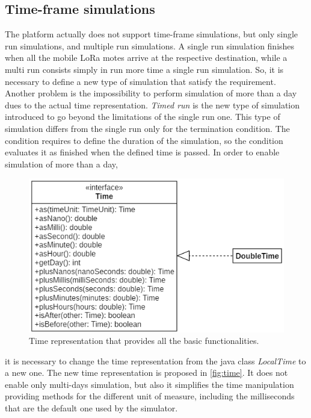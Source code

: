 \subsection*{Time-frame simulations}
The platform actually does not support time-frame simulations, but only single run simulations, and multiple run simulations.
A single run simulation finishes when all the mobile LoRa motes arrive at the respective destination, while a multi run consists simply in run more time a single run simulation.
So, it is necessary to define a new type of simulation that satisfy the requirement.
Another problem is the impossibility to perform simulation of more than a day dues to the actual time representation.
\textit{Timed run} is the new type of simulation introduced to go beyond the limitations of the single run one. 
This type of simulation differs from the single run only for the termination condition. 
The condition requires to define the duration of the simulation, so the condition evaluates it as finished when the defined time is passed.
In order to enable simulation of more than a day, 
%   
\begin{figure}[!b]
    \centering
    \includegraphics{figures/time.png}
    \caption[Time representation in DingNet simulator]{Time representation that provides all the basic functionalities.}
    \label{fig:time}
\end{figure}
% 
it is necessary to change the time representation from the java class \mbox{\textit{LocalTime}} to a new one.
The new time representation is proposed in \autoref{fig:time}.
It does not enable only multi-days simulation, but also it simplifies the time manipulation providing methods for the different unit of measure, including the milliseconds that are the default one used by the simulator.


